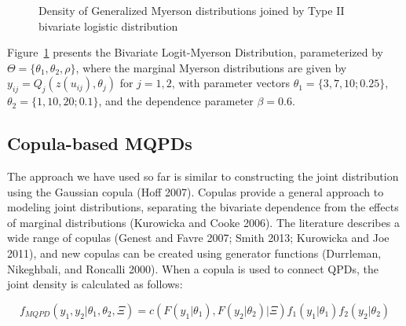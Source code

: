 \documentclass[
]{interact}
\begin{document}
\begin{figure}


\caption{\label{fig-bi-logitmyerson}Density of Generalized Myerson
distributions joined by Type II bivariate logistic distribution}

\end{figure}%

Figure~\ref{fig-bi-logitmyerson} presents the Bivariate Logit-Myerson
Distribution, parameterized by \(\Theta=\{\theta_1, \theta_2, \rho\}\),
where the marginal Myerson distributions are given by
\(y_{ij}=Q_j(z(u_{ij}),\theta_j)\) for \(j=1,2\), with parameter vectors
\(\theta_1=\{3,7,10;0.25\}\), \(\theta_2=\{1,10,20;0.1\}\), and the
dependence parameter \(\beta=0.6\).

\subsection{Copula-based MQPDs}\label{copula-based-mqpds}

The approach we have used so far is similar to constructing the joint
distribution using the Gaussian copula (Hoff 2007). Copulas provide a
general approach to modeling joint distributions, separating the
bivariate dependence from the effects of marginal distributions
(Kurowicka and Cooke 2006). The literature describes a wide range of
copulas (Genest and Favre 2007; Smith 2013; Kurowicka and Joe 2011), and
new copulas can be created using generator functions (Durrleman,
Nikeghbali, and Roncalli 2000). When a copula is used to connect QPDs,
the joint density is calculated as follows:

\[
f_{MQPD}(y_1,y_2\vert \theta_1,\theta_2,\Xi)=c(F(y_1\vert\theta_1),F(y_2\vert\theta_2)\vert\Xi)
f_1\left(y_1\vert\theta_1\right) f_2\left(y_2\vert\theta_2\right)
\]
\end{document}
